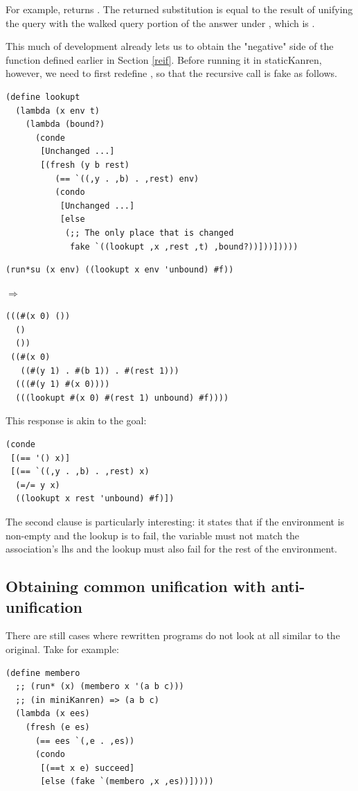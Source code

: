 For example,  returns . The returned substitution is equal to the result of unifying the query  with the walked query portion of the answer under , which is .

This much of development already lets us to obtain the "negative" side of the  function defined earlier in Section \ref{reif}. Before running it in staticKanren, however, we need to first redefine , so that the recursive call is fake as follows.
\begin{lstlisting}
(define lookupt
  (lambda (x env t)
    (lambda (bound?)
      (conde
       [Unchanged ...]
       [(fresh (y b rest)
          (== `((,y . ,b) . ,rest) env)
          (condo
           [Unchanged ...]
           [else
            (;; The only place that is changed
             fake `((lookupt ,x ,rest ,t) ,bound?))]))]))))
\end{lstlisting}

\begin{lstlisting}
(run*su (x env) ((lookupt x env 'unbound) #f))
\end{lstlisting}
$\Rightarrow$
\begin{lstlisting}
(((#(x 0) ())
  () 
  ())
 ((#(x 0) 
   ((#(y 1) . #(b 1)) . #(rest 1)))
  (((#(y 1) #(x 0))))
  (((lookupt #(x 0) #(rest 1) unbound) #f))))
\end{lstlisting}
This response is akin to the goal:
\begin{lstlisting}
(conde
 [(== '() x)]
 [(== `((,y . ,b) . ,rest) x)
  (=/= y x)
  ((lookupt x rest 'unbound) #f)])
\end{lstlisting}
The second clause is particularly interesting: it states that if the environment is non-empty and the lookup is to fail, the variable  must not match the association's lhs and the lookup must also fail for the rest of the environment.

\subsection{Obtaining common unification with anti-unification}\label{au}
There are still cases where rewritten programs do not look at all similar to the original. Take  for example:
\begin{lstlisting}
(define membero
  ;; (run* (x) (membero x '(a b c)))
  ;; (in miniKanren) => (a b c)
  (lambda (x ees)
    (fresh (e es)
      (== ees `(,e . ,es))
      (condo
       [(==t x e) succeed]
       [else (fake `(membero ,x ,es))]))))
\end{lstlisting}

